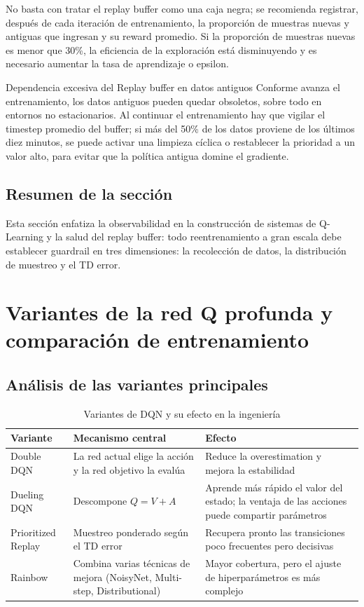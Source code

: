 \documentclass[a4paper]{article}
\begin{document}
No basta con tratar el replay buffer como una caja negra; se recomienda registrar, después de cada iteración de entrenamiento, la proporción de muestras nuevas y antiguas que ingresan y su reward promedio. Si la proporción de muestras nuevas es menor que 30\%, la eficiencia de la exploración está disminuyendo y es necesario aumentar la tasa de aprendizaje o epsilon.

\begin{warningbox}{Dependencia excesiva del Replay buffer en datos antiguos}
Conforme avanza el entrenamiento, los datos antiguos pueden quedar obsoletos, sobre todo en entornos no estacionarios. Al continuar el entrenamiento hay que vigilar el timestep promedio del buffer; si más del 50\% de los datos proviene de los últimos diez minutos, se puede activar una limpieza cíclica o restablecer la prioridad a un valor alto, para evitar que la política antigua domine el gradiente.
\end{warningbox}

\subsection{Resumen de la sección}

Esta sección enfatiza la observabilidad en la construcción de sistemas de Q-Learning y la salud del replay buffer: todo reentrenamiento a gran escala debe establecer guardrail en tres dimensiones: la recolección de datos, la distribución de muestreo y el TD error.
\section{Variantes de la red Q profunda y comparación de entrenamiento}

\subsection{Análisis de las variantes principales}

\begin{table}[H]
\centering
\begin{tabular}{lll}
\toprule
Variante & Mecanismo central & Efecto \\
\midrule
Double DQN & La red actual elige la acción y la red objetivo la evalúa & Reduce la overestimation y mejora la estabilidad \\
Dueling DQN & Descompone $Q=V+A$ & Aprende más rápido el valor del estado; la ventaja de las acciones puede compartir parámetros \\
Prioritized Replay & Muestreo ponderado según el TD error & Recupera pronto las transiciones poco frecuentes pero decisivas \\
Rainbow & Combina varias técnicas de mejora (NoisyNet, Multi-step, Distributional) & Mayor cobertura, pero el ajuste de hiperparámetros es más complejo \\
\bottomrule
\end{tabular}
\caption{Variantes de DQN y su efecto en la ingeniería}
\end{table}
\end{document}
